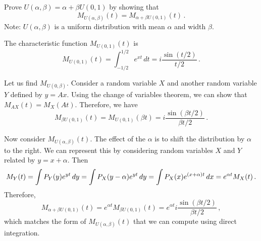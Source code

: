 

Prove $U(\alpha, \beta) = \alpha + \beta U(0, 1)$ by showing that
\begin{equation*}
  M_{U(\alpha, \beta)}(t) = M_{\alpha + \beta U(0, 1)}(t) \, .
\end{equation*}
Note: $U(\alpha, \beta)$ is a uniform distribution with mean $\alpha$ and width $\beta$.


The characteristic function $M_{U(0, 1)}(t)$ is
\begin{equation*}
  M_{U(0, 1)}(t) = \int_{-1/2}^{1/2} e^{xt} \, dt = i \frac{\sin(t/2)}{t/2} \, .
\end{equation*}

Let us find $M_{U(0, \beta)}$.
Consider a random variable $X$ and another random variable $Y$ defined by $y = Ax$.
Using the change of variables theorem, we can show that $M_{AX}(t) = M_X(At)$.
Therefore, we have
\begin{equation*}
  M_{\beta U(0, 1)}(t) = M_{U(0, 1)}(\beta t) = i \frac{\sin(\beta t / 2)}{\beta t / 2} \, .
\end{equation*}

Now consider $M_{U(\alpha, \beta)}(t)$.
The effect of the $\alpha$ is to shift the distribution by $\alpha$ to the right.
We can represent this by considering random variables $X$ and $Y$ related by $y = x + \alpha$.
Then
\begin{equation*}
  M_Y(t)
  =              \int P_Y(y) e^{yt} \, dy \\
  =              \int P_X(y - \alpha) e^{yt} \, dy \\
  =              \int P_X(x) e^{(x + \alpha)t} \, dx \\
  = e^{\alpha t} M_X(t) \, .
\end{equation*}
Therefore,
\begin{equation*}
  M_{\alpha + \beta U(0, 1)}(t)
  = e^{\alpha t} M_{\beta U(0, 1)}(t)
  = e^{\alpha t} i \frac{\sin(\beta t/2)}{\beta t/2}\, ,
\end{equation*}
which matches the form of $M_{U(\alpha, \beta)}(t)$ that we can compute using direct integration.
